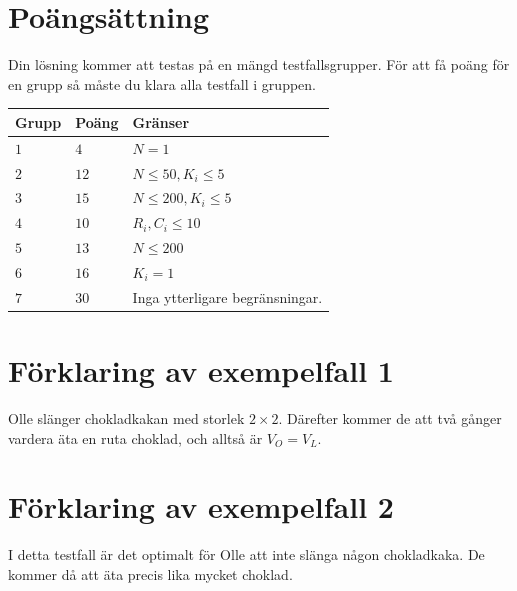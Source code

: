 \section*{Poängsättning}
Din lösning kommer att testas på en mängd testfallsgrupper.
För att få poäng för en grupp så måste du klara alla testfall i gruppen.

\noindent
\begin{tabular}{| l | l | p{12cm} |}
  \hline
  \textbf{Grupp} & \textbf{Poäng} & \textbf{Gränser} \\ \hline
  $1$    & $4$        & $N = 1$ \\ \hline
  $2$    & $12$       & $N \leq 50, K_i \leq 5$ \\ \hline
  $3$    & $15$       & $N \leq 200, K_i \leq 5$ \\ \hline
  $4$    & $10$       & $R_i, C_i \leq 10$ \\ \hline
  $5$    & $13$       & $N \leq 200$ \\ \hline
  $6$    & $16$       & $K_i = 1$ \\ \hline
  $7$    & $30$       & Inga ytterligare begränsningar. \\ \hline
\end{tabular}

\section*{Förklaring av exempelfall 1}
Olle slänger chokladkakan med storlek $2 \times 2$. 
Därefter kommer de att två gånger vardera äta en ruta choklad, och alltså är $V_O = V_L$.

\section*{Förklaring av exempelfall 2}
I detta testfall är det optimalt för Olle att inte slänga någon chokladkaka. 
De kommer då att äta precis lika mycket choklad.

